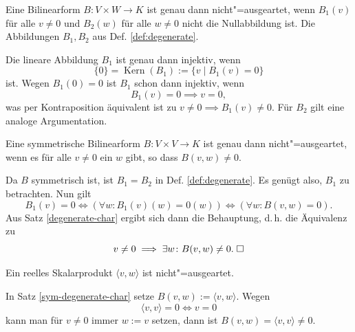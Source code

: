 \begin{Satz}\label{degenerate-char}
Eine Bilinearform $B\colon V\times W\to K$ ist genau dann
nicht"=ausgeartet, wenn $B_1(v)$ für alle $v\ne 0$ und $B_2(w)$ für
alle $w\ne 0$ nicht die Nullabbildung ist. Die Abbildungen $B_1,B_2$
aus Def. \ref{def:degenerate}.
\end{Satz}
\begin{Beweis}
Die lineare Abbildung $B_1$ ist genau dann injektiv, wenn
\begin{equation}
\{0\} = \operatorname{Kern}(B_1) := \{v\mid B_1(v)=0\}
\end{equation}
ist. Wegen $B_1(0)=0$ ist $B_1$ schon dann injektiv, wenn
\begin{equation}
B_1(v)=0\implies v=0,
\end{equation}
was per Kontraposition äquivalent ist zu $v\ne 0\implies B_1(v)\ne 0$.
Für $B_2$ gilt eine analoge Argumentation.\;\qedsymbol
\end{Beweis}
\begin{Satz}\label{sym-degenerate-char}
Eine symmetrische Bilinearform $B\colon V\times V\to K$ ist genau
dann nicht"=ausgeartet, wenn es für alle $v\ne 0$ ein $w$ gibt, so
dass $B(v,w)\ne 0$.
\end{Satz}
\begin{Beweis}
Da $B$ symmetrisch ist, ist $B_1=B_2$ in Def. \ref{def:degenerate}.
Es genügt also, $B_1$ zu
betrachten. Nun gilt%
\begin{equation}
B_1(v)=0 \iff (\forall w\colon B_1(v)(w)=0(w)) \iff (\forall w\colon B(v,w)=0).
\end{equation}
Aus Satz \ref{degenerate-char} ergibt sich dann die Behauptung,
d.\,h. die Äquivalenz zu
\begin{equation}
v\ne 0\implies \exists w\colon B(v,w)\ne 0.\;\square
\end{equation}
\end{Beweis}
\begin{Satz}
Ein reelles Skalarprodukt $\langle v,w\rangle$ ist nicht"=ausgeartet.
\end{Satz}
\begin{Beweis}
In Satz \ref{sym-degenerate-char} setze
$B(v,w):=\langle v,w\rangle$. Wegen
\begin{equation}
\langle v,v\rangle = 0 \iff v=0
\end{equation}
kann man für $v\ne 0$ immer $w:=v$ setzen, dann ist
$B(v,w)=\langle v,v\rangle\ne 0$.\;\qedsymbol
\end{Beweis}


